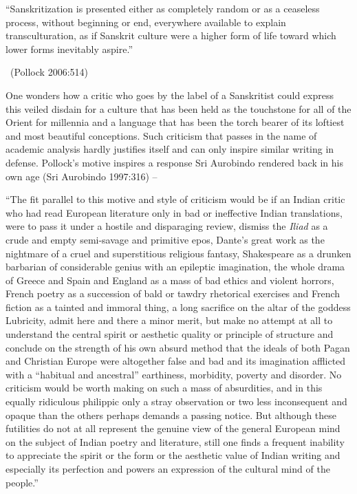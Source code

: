 \begin{myquote}
“Sanskritization is presented either as completely random or as a ceaseless process, without beginning or end, everywhere available to explain transculturation, as if Sanskrit culture were a higher form of life toward which lower forms inevitably aspire.” 

\vskip -5pt

~\hfill (Pollock 2006:514)
\end{myquote}

One wonders how a critic who goes by the label of a Sanskritist could express this veiled disdain for a culture that has been held as the touchstone for all of the Orient for millennia and a language that has been the torch bearer of its loftiest and most beautiful conceptions. Such criticism that passes in the name of academic analysis hardly justifies itself and can only inspire similar writing in defense. Pollock’s motive inspires a response Sri Aurobindo rendered back in his own age (Sri Aurobindo 1997:316) –

\begin{myquote}
“The fit parallel to this motive and style of criticism would be if an Indian critic who had read European literature only in bad or ineffective Indian translations, were to pass it under a hostile and disparaging review, dismiss the \textit{Iliad} as a crude and empty semi-savage and primitive epos, Dante’s great work as the nightmare of a cruel and superstitious religious fantasy, Shakespeare as a drunken barbarian of considerable genius with an epileptic imagination, the whole drama of Greece and Spain and England as a mass of bad ethics and violent horrors, French poetry as a succession of bald or tawdry rhetorical exercises and French fiction as a tainted and immoral thing, a long sacrifice on the altar of the goddess Lubricity, admit here and there a minor merit, but make no attempt at all to understand the central spirit or aesthetic quality or principle of structure and conclude on the strength of his own absurd method that the ideals of both Pagan and Christian Europe were altogether false and bad and its imagination afflicted with a “habitual and ancestral” earthiness, morbidity, poverty and disorder. No criticism would be worth making on such a mass of absurdities, and in this equally ridiculous philippic only a stray observation or two less inconsequent and opaque than the others perhaps demands a passing notice. But although these futilities do not at all represent the genuine view of the general European mind on the subject of Indian poetry and literature, still one finds a frequent inability to appreciate the spirit or the form or the aesthetic value of Indian writing and especially its perfection and powers an expression of the cultural mind of the people.”
\end{myquote}

